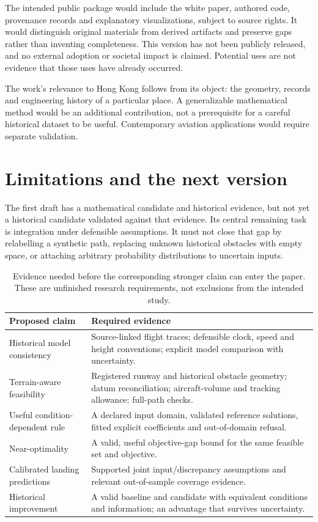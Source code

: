 The intended public package would include the white paper, authored code, provenance records and explanatory visualizations, subject to source rights. It would distinguish original materials from derived artifacts and preserve gaps rather than inventing completeness. This version has not been publicly released, and no external adoption or societal impact is claimed. Potential uses are not evidence that those uses have already occurred.

The work's relevance to Hong Kong follows from its object: the geometry, records and engineering history of a particular place. A generalizable mathematical method would be an additional contribution, not a prerequisite for a careful historical dataset to be useful. Contemporary aviation applications would require separate validation.

\section{Limitations and the next version}
\label{sec:next}
The first draft has a mathematical candidate and historical evidence, but not yet a historical candidate validated against that evidence. Its central remaining task is integration under defensible assumptions. It must not close that gap by relabelling a synthetic path, replacing unknown historical obstacles with empty space, or attaching arbitrary probability distributions to uncertain inputs.

\begin{table}[H]
\caption{Evidence needed before the corresponding stronger claim can enter the paper. These are unfinished research requirements, not exclusions from the intended study.}
\small
\begin{tabularx}{\textwidth}{@{}p{}X@{}}
\toprule
Proposed claim & Required evidence\\
\midrule
Historical model consistency & Source-linked flight traces; defensible clock, speed and height conventions; explicit model comparison with uncertainty.\\
Terrain-aware feasibility & Registered runway and historical obstacle geometry; datum reconciliation; aircraft-volume and tracking allowance; full-path checks.\\
Useful condition-dependent rule & A declared input domain, validated reference solutions, fitted explicit coefficients and out-of-domain refusal.\\
Near-optimality & A valid, useful objective-gap bound for the same feasible set and objective.\\
Calibrated landing predictions & Supported joint input/discrepancy assumptions and relevant out-of-sample coverage evidence.\\
Historical improvement & A valid baseline and candidate with equivalent conditions and information; an advantage that survives uncertainty.\\
\bottomrule
\end{tabularx}
\end{table}

